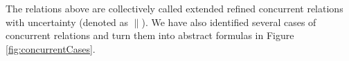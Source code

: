 \documentclass{llncs}
\begin{document}
The relations above are collectively called extended refined concurrent relations with uncertainty (denoted as $\parallel$). We have also identified several cases of concurrent relations and turn them into abstract formulas in Figure \ref{fig:concurrentCases}.
\\
\begin{figure}[htbp]
\centering
{}
\end{figure}
\end{document}
